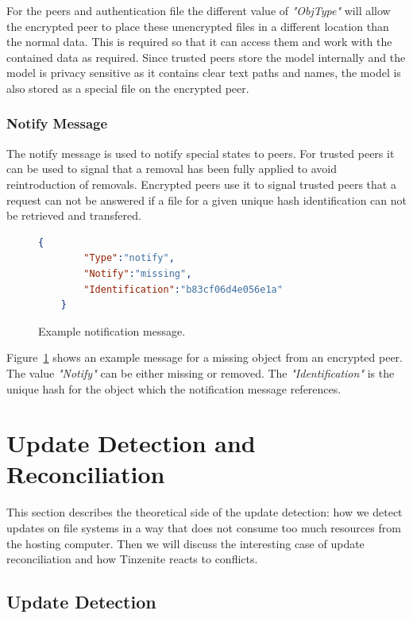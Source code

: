 For the peers and authentication file the different value of \textit{"ObjType"} will allow the encrypted peer to place these unencrypted files in a different location than the normal data.
This is required so that it can access them and work with the contained data as required.
Since trusted peers store the model internally and the model is privacy sensitive as it contains clear text paths and names, the model is also stored as a special file on the encrypted peer.

\subsubsection{Notify Message}
\label{subs:Notify Message}

The notify message is used to notify special states to peers.
For trusted peers it can be used to signal that a removal has been fully applied to avoid reintroduction of removals.
Encrypted peers use it to signal trusted peers that a request can not be answered if a file for a given unique hash identification can not be retrieved and transfered.

\begin{figure}[htp]
    \begin{lstlisting}[language=json,firstnumber=0]
    {
        "Type":"notify",
        "Notify":"missing",
        "Identification":"b83cf06d4e056e1a"
    }
    \end{lstlisting}
\caption[Notify Message]{Example notification message.}
\label{json:notify_message}
\end{figure}

Figure~\ref{json:notify_message} shows an example message for a missing object from an encrypted peer.
The value \textit{"Notify"} can be either missing or removed.
The \textit{"Identification"} is the unique hash for the object which the notification message references.

\section{Update Detection and Reconciliation}
\label{sec:Update Detection and Reconciliation}

This section describes the theoretical side of the update detection: how we detect updates on file systems in a way that does not consume too much resources from the hosting computer.
Then we will discuss the interesting case of update reconciliation and how Tinzenite reacts to conflicts.

\subsection{Update Detection}
\label{sub:Update Detection}

